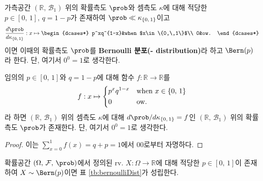 \begin{definition}
    가측공간 $(\mathbb{R},\,\mathcal{B}_1)$ 위의 확률측도 $\prob$와 셈측도 $\kappa$에 대해 적당한 $p\in[0,\,1],\,q=1-p$가 존재하여 $\prob\ll\kappa_{\{0,\,1\}}$이고
    \begin{equation*}
        \frac{d\prob}{d\kappa_{\{0,\,1\}}}:x\mapsto
        \begin{dcases*}
            p^xq^{1-x}&when $x\in\{0,\,1\}$\\
            0&ow.
        \end{dcases*}
    \end{equation*}
    이면 이때의 확률측도 $\prob$를 \textbf{Bernoulli 분포(- distribution)}라 하고 $\Bern(p)$라 한다. 단, 여기서 $0^0=1$로 생각한다.
\end{definition}

\begin{proposition}
    임의의 $p\in[0,\,1]$와 $q=1-p$에 대해 함수 $f:\mathbb{R}\to\mathbb{R}$를
    \begin{equation*}
        f:x\mapsto
        \begin{dcases*}
            p^xq^{1-x}&when $x\in\{0,\,1\}$\\
            0&ow.
        \end{dcases*}
    \end{equation*}
    라 하면 $(\mathbb{R},\,\mathcal{B}_1)$ 위의 셈측도 $\kappa$에 대해 $d\prob/d\kappa_{\{0,\,1\}}=f$인 $(\mathbb{R},\,\mathcal{B}_1)$ 위의 확률측도 $\prob$가 존재한다. 단, 여기서 $0^0=1$로 생각한다.
\end{proposition}

\begin{proof}
    이는 $\sum_{x=0}^1f(x)=q+p=1$에서 00로부터 자명하다.
\end{proof}

\begin{theorem}
    확률공간 $(\Omega,\,\mathcal{F},\,\prob)$에서 정의된 rv. $X:\Omega\to\mathbb{R}$에 대해 적당한 $p\in[0,\,1]$이 존재하여 $X\sim\Bern(p)$이면 표 \ref{tb:bernoulliDist}가 성립한다.
\end{theorem}

